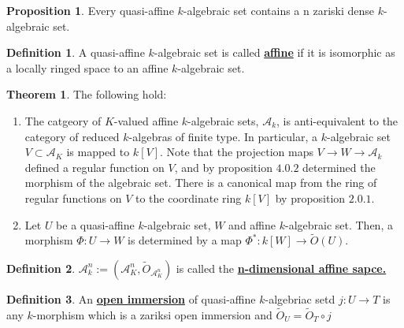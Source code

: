 \documentclass{article}
\theoremstyle{definition}
\newtheorem{theorem}{Theorem}[section]
\theoremstyle{definition}
\newtheorem{definition}{Definition}[theorem]
\theoremstyle{definition}
\theoremstyle{definition}
\newtheorem{proposition}{Proposition}[theorem]
\theoremstyle{definition}
\theoremstyle{definition}
\theoremstyle{definition}
\begin{document}
\begin{tcolorbox}[colback=blue!5!white,colframe=blue!30!white]
\begin{proposition}
Every quasi-affine $k$-algebraic set contains a n zariski dense $k$-algebraic set. 
\end{proposition}
\end{tcolorbox}

\begin{tcolorbox}[colback=purple!5!white,colframe=purple!75!black]
\begin{definition}
A quasi-affine $k$-algebraic set is called \underline{\textbf{affine}} if it is isomorphic as a locally ringed space to an affine $k$-algebraic set. 

\end{definition}
\end{tcolorbox}


\begin{tcolorbox}[colback=red!5!white,colframe=red!30!white]
\begin{theorem}
The following hold:
\begin{enumerate}
    \item The catgeory of $K$-valued affine $k$-algebraic sets, $\mathcal{A}_k$, is anti-equivalent to the category of reduced $k$-algebras of finite type. In particular, a $k$-algebraic set $V\subset \mathcal{A}_K$ is mapped to $k[V]$. Note that the projection maps $V\to W\to \mathcal{A}_k$ defined a regular function on $V$, and by proposition $4.0.2$ determined the morphism of the algebraic set. There is a canonical map from the ring of regular functions on $V$ to the coordinate ring $k[V]$ by proposition $2.0.1$. 
    \item Let $U$ be a quasi-affine $k$-algebraic set, $W$ and affine $k$-algebraic set. Then, a morphism $\Phi: U\to W$ is determined by a map $\Phi^*: k[W]\to \tilde{O}(U)$. 
\end{enumerate}
\end{theorem}
\end{tcolorbox}


\begin{tcolorbox}[colback=purple!5!white,colframe=purple!75!black]
\begin{definition}
$\mathcal{A}^n_k:=(\mathcal{A}_K^n,\tilde{O}_{\mathcal{A}_K^n})$ is called the \underline{\textbf{n-dimensional affine sapce.}}
\end{definition}
\end{tcolorbox}


\begin{tcolorbox}[colback=purple!5!white,colframe=purple!75!black]
\begin{definition}
An \underline{\textbf{open immersion}} of quasi-affine $k$-algebriac setd $j: U\to T$ is any $k$-morphism which is a zariksi open immersion and $\tilde{O}_U=\tilde{O}_T\circ j$
\end{definition}
\end{tcolorbox}
\end{document}
